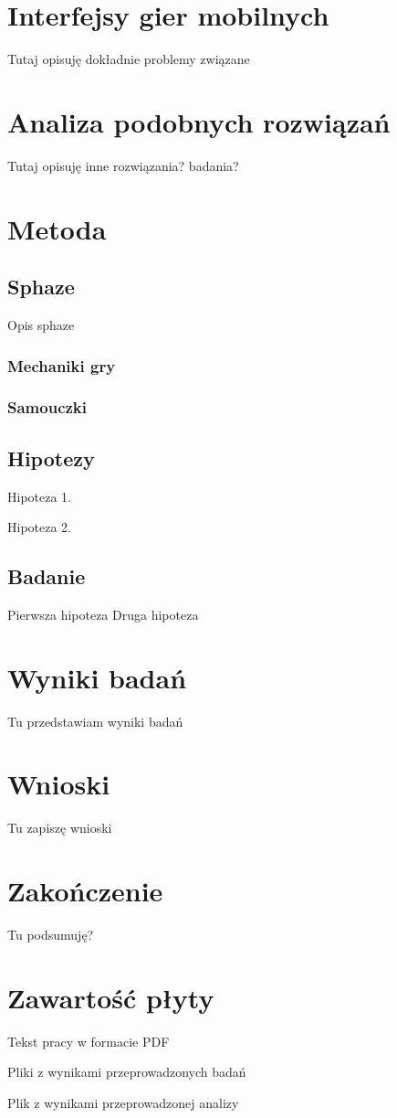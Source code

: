 \documentclass[a4paper,12pt,numbers=noenddot]{report}
\begin{document}
\chapter{Interfejsy gier mobilnych}
Tutaj opisuję dokładnie problemy związane
\chapter{Analiza podobnych rozwiązań}
Tutaj opisuję inne rozwiązania? badania?
\chapter{Metoda}
	\section{Sphaze}
Opis sphaze
		\subsection{Mechaniki gry}
		\subsection{Samouczki}
	\section{Hipotezy}
Hipoteza 1.

Hipoteza 2.

	\section{Badanie}
Pierwsza hipoteza
Druga hipoteza

\chapter{Wyniki badań}
Tu przedstawiam wyniki badań
\chapter{Wnioski}
Tu zapiszę wnioski
\chapter{Zakończenie}
Tu podsumuję?


\chapter{Zawartość płyty}
\begin{enumerate}[label={[\arabic*]}]
  \item Tekst pracy w formacie PDF
  \item Pliki z wynikami przeprowadzonych badań
  \item Plik z wynikami przeprowadzonej analizy
\end{enumerate}

\end{document}
